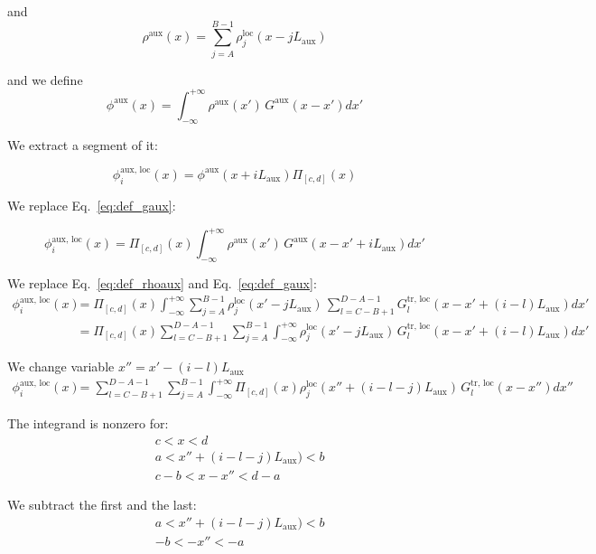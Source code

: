 and 
\begin{equation}
\rho^\text{aux}(x)= 
\sum_{j=A}^{B-1} \rho_{j}^\text{loc}(x - jL_\text{aux})
\label{eq:def_rhoaux}
\end{equation}

and we define 
\begin{equation}
\phi^\text{aux}(x)= 
\int_{-\infty}^{+\infty}
\rho^\text{aux}(x')\,G^\text{aux}(x-x') dx'
\label{eq:def_phiaux}
\end{equation}

We extract a segment of it:


\begin{equation}
\phi^\text{aux, loc}_i(x)= 
\phi^\text{aux}(x + iL_\text{aux}) 
\Pi_{[c, d]}(x)
\label{eq:def_phiauxloc}
\end{equation}

We replace Eq.~\ref{eq:def_gaux}:

\begin{equation}
\phi^\text{aux, loc}_i(x)= 
\Pi_{[c, d]}(x)
\int_{-\infty}^{+\infty}
\rho^\text{aux}(x')\,G^\text{aux}(x-x'+iL_\text{aux}) dx'
\end{equation}

We replace Eq.~\ref{eq:def_rhoaux} and Eq.~\ref{eq:def_gaux}:
\begin{align}
\phi^\text{aux, loc}_i(x)&= 
\Pi_{[c, d]}(x)
\int_{-\infty}^{+\infty}
\sum_{j=A}^{B-1} \rho_{j}^\text{loc}(x' - jL_\text{aux})\,
\sum_{l=C-B+1}^{D-A-1}
G^\text{tr, loc}_{l}(x-x'+(i-l)L_\text{aux})
dx'\\
&=
\Pi_{[c, d]}(x)
\sum_{l=C-B+1}^{D-A-1} \sum_{j=A}^{B-1} \int_{-\infty}^{+\infty}\rho_{j}^\text{loc}(x' - jL_\text{aux})\,
G^\text{tr, loc}_{l}(x-x'+(i-l)L_\text{aux})
dx'
\end{align}

We change variable $x''= x' - (i-l)L_\text{aux}$
\begin{align}
\phi^\text{aux, loc}_i(x)
&=
\sum_{l=C-B+1}^{D-A-1} \sum_{j=A}^{B-1} \int_{-\infty}^{+\infty}
\Pi_{[c, d]}(x)
\rho_{j}^\text{loc}(x'' + (i-l -j)L_\text{aux})\,
G^\text{tr, loc}_{l}(x-x'')
dx''
\end{align}

The integrand is nonzero for:
\begin{align}
& c < x <d\\
& a < x'' +(i-l-j)L_\text{aux}) < b\\
& c-b < x-x''< d-a
\end{align}

We subtract the first and the last:
\begin{align}
& a < x'' +(i-l-j)L_\text{aux}) < b\\
& -b < -x''< -a
\end{align}

